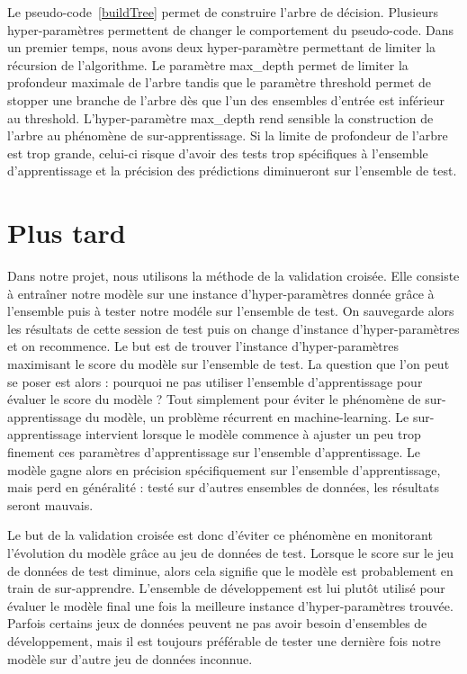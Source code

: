 \documentclass[french, 14pt]{memoir}
\begin{document}
Le pseudo-code~\ref{buildTree} permet de construire l'arbre de décision. Plusieurs hyper-paramètres permettent de changer le comportement du pseudo-code. Dans un premier temps, nous avons deux hyper-paramètre permettant de limiter la récursion de l'algorithme. Le paramètre max\_depth permet de limiter la profondeur maximale de l'arbre tandis que le paramètre threshold permet de stopper une branche de l'arbre dès que l'un des ensembles d'entrée est inférieur au threshold. L'hyper-paramètre max\_depth rend sensible la construction de l'arbre au phénomène de sur-apprentissage. Si la limite de profondeur de l'arbre est trop grande, celui-ci risque d'avoir des tests trop spécifiques à l'ensemble d'apprentissage et la précision des prédictions diminueront sur l'ensemble de test. 

\chapter*{Plus tard}

Dans notre projet, nous utilisons la méthode de la validation croisée. Elle consiste à entraîner notre modèle sur une instance d'hyper-paramètres donnée grâce à l'ensemble puis à tester notre modéle sur l'ensemble de test. On sauvegarde alors les résultats de cette session de test puis on change d'instance d'hyper-paramètres et on recommence. Le but est de trouver l'instance d'hyper-paramètres maximisant le score du modèle sur l'ensemble de test.
La question que l'on peut se poser est alors : pourquoi ne pas utiliser l'ensemble d'apprentissage pour évaluer le score du modèle ? 
Tout simplement pour éviter le phénomène de sur-apprentissage du modèle, un problème récurrent en machine-learning. Le sur-apprentissage intervient lorsque le modèle commence à ajuster un peu trop finement ces paramètres d'apprentissage sur l'ensemble d'apprentissage. Le modèle gagne alors en précision spécifiquement sur l'ensemble d'apprentissage, mais perd en généralité : testé sur d'autres ensembles de données, les résultats seront mauvais.

Le but de la validation croisée est donc d'éviter ce phénomène en monitorant l'évolution du modèle grâce au jeu de données de test. Lorsque le score sur le jeu de données de test diminue, alors cela signifie que le modèle est probablement en train de sur-apprendre. 
L'ensemble de développement est lui plutôt utilisé pour évaluer le modèle final une fois la meilleure instance d'hyper-paramètres trouvée. Parfois certains jeux de données peuvent ne pas avoir besoin d'ensembles de développement, mais il est toujours préférable de tester une dernière fois notre modèle sur d'autre jeu de données inconnue. 
\end{document}
